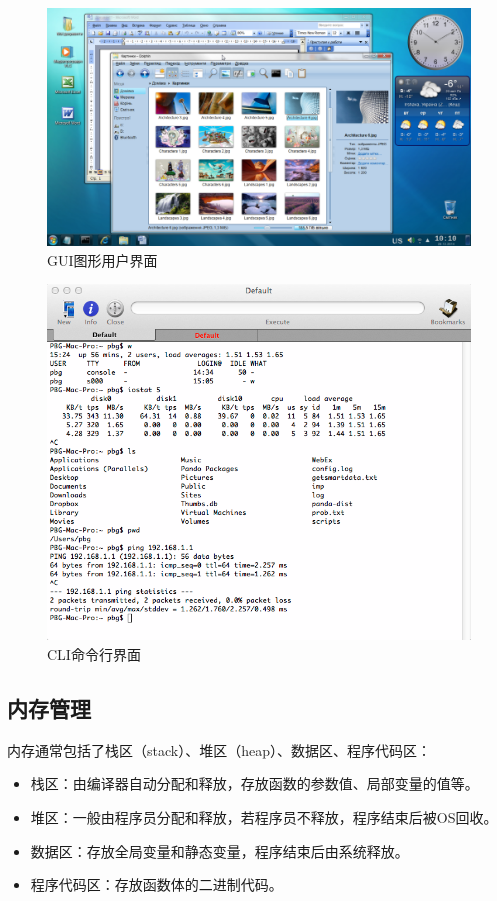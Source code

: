 \begin{figure}[H]
	\centering
	\includegraphics[]{img/C2/2-1/2.png}
	\caption{GUI图形用户界面}
\end{figure}

\begin{figure}[H]
	\centering
	\includegraphics[scale=0.5]{img/C2/2-1/3.png}
	\caption{CLI命令行界面}
\end{figure}

\subsection{内存管理}

内存通常包括了栈区（stack）、堆区（heap）、数据区、程序代码区：

\begin{itemize}
	\item 栈区：由编译器自动分配和释放，存放函数的参数值、局部变量的值等。

	\item 堆区：一般由程序员分配和释放，若程序员不释放，程序结束后被OS回收。

	\item 数据区：存放全局变量和静态变量，程序结束后由系统释放。

	\item 程序代码区：存放函数体的二进制代码。
\end{itemize}

